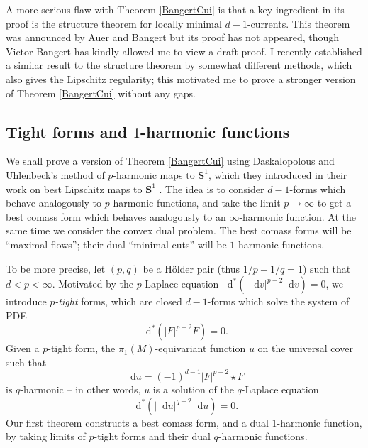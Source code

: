 \documentclass[reqno,11pt]{amsart}
\newcommand{\Sph}{\mathbf S}
\newcommand*\dif{\mathop{}\!\mathrm{d}}
\newcommand{\dfn}[1]{\emph{#1}\index{#1}}
\theoremstyle{definition}
\numberwithin{equation}{section}
\begin{document}
A more serious flaw with Theorem \ref{BangertCui} is that a key ingredient in its proof is the structure theorem for locally minimal $d - 1$-currents.
This theorem was announced by Auer and Bangert \cite{Auer01} but its proof has not appeared, though Victor Bangert has kindly allowed me to view a draft proof.
I recently established a similar result to the structure theorem \cite[Theorem C]{BackusCML} by somewhat different methods, which also gives the Lipschitz regularity; this motivated me to prove a stronger version of Theorem \ref{BangertCui} without any gaps.


\subsection{\texorpdfstring{Tight forms and $1$-harmonic functions}{Tight forms and one-harmonic functions}}
We shall prove a version of Theorem \ref{BangertCui} using Daskalopolous and Uhlenbeck's method of $p$-harmonic maps to $\Sph^1$, which they introduced in their work on best Lipschitz maps to $\Sph^1$ \cite{daskalopoulos2020transverse}.
The idea is to consider $d - 1$-forms which behave analogously to $p$-harmonic functions, and take the limit $p \to \infty$ to get a best comass form which behaves analogously to an $\infty$-harmonic function.
At the same time we consider the convex dual problem.
The best comass forms will be ``maximal flows''; their dual ``minimal cuts'' will be $1$-harmonic functions.

To be more precise, let $(p, q)$ be a H\"older pair (thus $1/p + 1/q = 1$) such that $d < p < \infty$.
Motivated by the $p$-Laplace equation $\dif^*(|\dif v|^{p - 2} \dif v) = 0$, we introduce \dfn{$p$-tight} forms, which are closed $d-1$-forms which solve the system of PDE
$$\dif^*(|F|^{p - 2} F) = 0.$$
Given a $p$-tight form, the $\pi_1(M)$-equivariant function $u$ on the universal cover such that
$$\dif u = (-1)^{d - 1} |F|^{p - 2} \star F$$
is $q$-harmonic -- in other words, $u$ is a solution of the $q$-Laplace equation 
$$\dif^*(|\dif u|^{q - 2} \dif u) = 0.$$
Our first theorem constructs a best comass form, and a dual $1$-harmonic function, by taking limits of $p$-tight forms and their dual $q$-harmonic functions.
\end{document}
